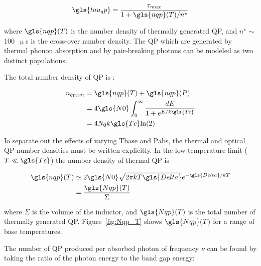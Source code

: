 \begin{equation}\label{eq:tau_qp}
  \gls{tau_qp} = \frac{\tau_{max}}{1 + \gls{nqp}(T)/n^{\star}}
\end{equation}

where $\gls{nqp}(T)$ is the number density of thermally generated QP, and $n^{\star}$ $\sim$ 100~$\upmu$s is the cross-over number density. The QP which are generated by thermal phonon absorption and by pair-breaking photons can be modeled as two distinct populations.

The total number density of QP is \citep{mauskopf2018transition}:

\begin{equation}\label{eq:nqp_tot}
  \begin{aligned}
  n_{qp,\mathrm{tot}} &= \gls{nqp}(T) + \gls{nqp}(P) \\
          &= 4\gls{N0} \int_{0}^{\infty} \frac{dE}{1 + e^{E/k\gls{Tc}}} \\
          &= 4N_{0}k\gls{Tc}\text{ln(2)}
  \end{aligned}
\end{equation}

Io separate out the effects of varying \gls{Tbase} and \gls{Pabs}, the thermal and optical QP number densities must be written explicitly. In the low temperature limit ($T \ll \gls{Tc}$) the number density of thermal QP is

\begin{equation}\label{eq:Nqp_T}
  \begin{aligned}
  \gls{nqp}(T) &\simeq 2\gls{N0}\sqrt{2\pi k T \gls{Delta}}e^{-\gls{Delta}/kT} \\
               &= \frac{\gls{Nqp}(T)}{\Sigma}
  \end{aligned}
\end{equation}

where $\Sigma$ is the volume of the inductor, and $\gls{Nqp}(T)$ is the total number of thermally generated QP. Figure~\ref{fig:Nqp_T} shows $\gls{Nqp}(T)$ for a range of base temperatures.

The number of QP produced per absorbed photon of frequency $\nu$ can be found by taking the ratio of the photon energy to the band gap energy:

